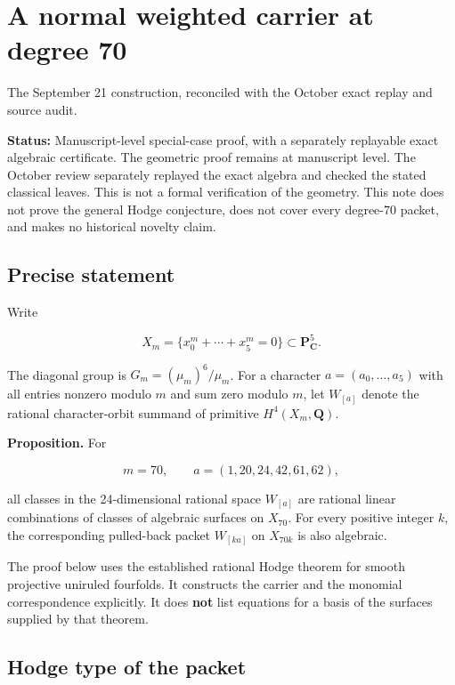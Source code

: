 \hypertarget{carrier70-a-normal-weighted-carrier-at-degree-70}{%
\chapter{A normal weighted carrier at degree
70}\label{ch:carrier70}\label{carrier70-a-normal-weighted-carrier-at-degree-70}}

The September 21 construction, reconciled with the October exact replay
and source audit.

\textbf{Status:} Manuscript-level special-case proof, with a separately
replayable exact algebraic certificate. The geometric proof remains at
manuscript level. The October review separately replayed the exact
algebra and checked the stated classical leaves. This is not a formal
verification of the geometry. This note does not prove the general Hodge
conjecture, does not cover every degree-70 packet, and makes no
historical novelty claim.

\hypertarget{carrier70-precise-statement}{%
\section{Precise statement}\label{carrier70-precise-statement}}

Write

\[
X_m=\{x_0^m+\cdots+x_5^m=0\}\subset\mathbf P^5_\mathbf C.
\]

The diagonal group is \(G_m=(\mu_m)^6/\mu_m\). For a character
\(a=(a_0,\ldots,a_5)\) with all entries nonzero modulo \(m\) and sum
zero modulo \(m\), let \(W_{[a]}\) denote the rational character-orbit
summand of primitive \(H^4(X_m,\mathbf Q)\).

\textbf{Proposition.} For

\[
m=70,\qquad a=(1,20,24,42,61,62),
\]

all classes in the 24-dimensional rational space \(W_{[a]}\) are
rational linear combinations of classes of algebraic surfaces on
\(X_{70}\). For every positive integer \(k\), the corresponding
pulled-back packet \(W_{[ka]}\) on \(X_{70k}\) is also algebraic.

The proof below uses the established rational Hodge theorem for smooth
projective uniruled fourfolds. It constructs the carrier and the
monomial correspondence explicitly. It does \textbf{not} list equations
for a basis of the surfaces supplied by that theorem.

\hypertarget{carrier70-hodge-type-of-the-packet}{%
\section{Hodge type of the packet}\label{carrier70-hodge-type-of-the-packet}}

